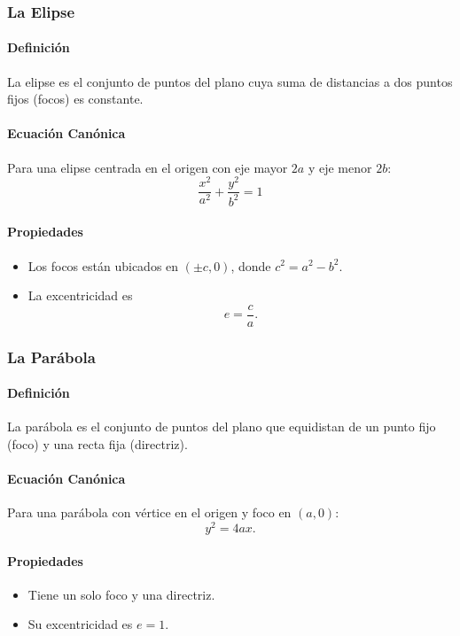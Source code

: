 \documentclass[11pt]{book}
\theoremstyle{definicion}
\theoremstyle{teorema}
\theoremstyle{ejemplo}
\begin{document}
\subsubsection{La Elipse}
\paragraph{Definición}
La elipse es el conjunto de puntos del plano cuya suma de distancias a dos puntos fijos (focos) es constante.

\paragraph{Ecuación Canónica}
Para una elipse centrada en el origen con eje mayor \( 2a \) y eje menor \( 2b \):
\[
\frac{x^2}{a^2} + \frac{y^2}{b^2} = 1
\]

\paragraph{Propiedades}
\begin{itemize}
    \item Los focos están ubicados en \( (\pm c, 0) \), donde \( c^2 = a^2 - b^2 \).
    \item La excentricidad es \[ e = \frac{c}{a}.\]
\end{itemize}

\subsubsection{La Parábola}
\paragraph{Definición}
La parábola es el conjunto de puntos del plano que equidistan de un punto fijo (foco) y una recta fija (directriz).

\paragraph{Ecuación Canónica}
Para una parábola con vértice en el origen y foco en \( (a, 0) \):
\[
y^2 = 4ax.
\]
\paragraph{Propiedades}
\begin{itemize}
    \item Tiene un solo foco y una directriz.
    \item Su excentricidad es \( e = 1 \).
\end{itemize}
\end{document}
